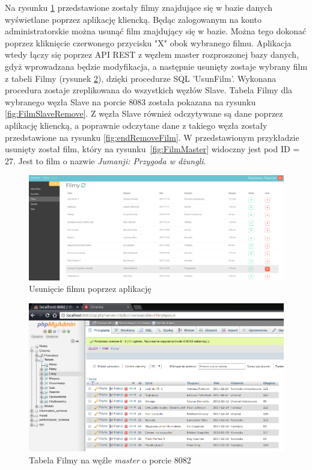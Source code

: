 Na rysunku \ref{fig:removeFilm} przedstawione zostały filmy znajdujące się w bazie danych wyświetlane poprzez aplikację kliencką. Będąc zalogowanym na konto administratorskie można usunąć film znajdujący się w bazie. Można tego dokonać poprzez kliknięcie czerwonego przycisku "X" obok wybranego filmu. Aplikacja wtedy łączy się poprzez API REST z węzłem master rozproszonej bazy danych, gdyż wprowadzana będzie modyfikacja, a następnie usunięty zostaje wybrany film z tabeli Filmy (rysunek \ref{fig:FilmMasterRemove}), dzięki procedurze SQL 'UsunFilm'. Wykonana procedura zostaje zreplikowana do wszystkich węzłów Slave. Tabela Filmy dla wybranego węzła Slave na porcie 8083 została pokazana na rysunku \ref{fig:FilmSlaveRemove}. Z węzła Slave również odczytywane są dane poprzez aplikację kliencką, a poprawnie odczytane dane z takiego węzła zostały przedstawione na rysunku \ref{fig:endRemoveFilm}. W przedstawionym przykładzie usunięty został film, który na rysunku~\ref{fig:FilmMaster} widoczny jest pod ID = 27. Jest to film o nazwie \textit{Jumanji: Przygoda w dżungli}.

\begin{figure} [H]
	\centering
	\includegraphics[width=1\linewidth]{rozdzial06/r1.png}
	\caption{Usunięcie filmu poprzez aplikację}
	\label{fig:removeFilm}
\end{figure}

\begin{figure} [H]
	\centering
	\includegraphics[width=1\linewidth]{rozdzial06/r2.png}
	\caption{Tabela Filmy na węźle \textit{master} o porcie 8082}
	\label{fig:FilmMasterRemove}
\end{figure}


